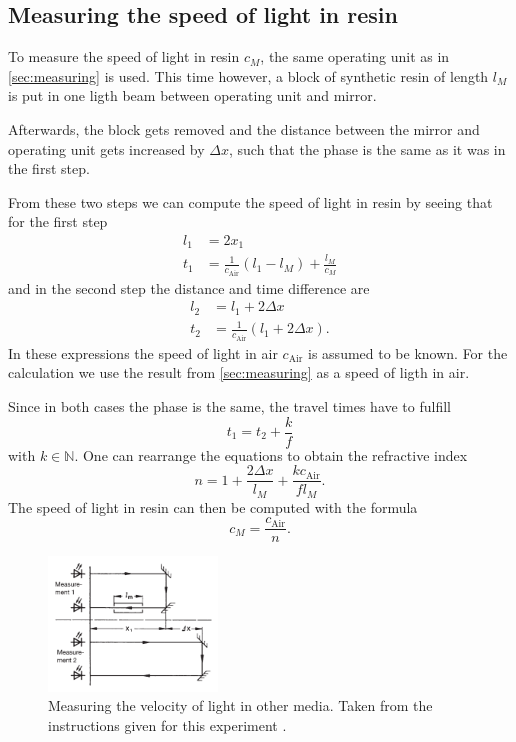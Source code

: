 \subsection{Measuring the speed of light in resin}
\label{sec:MeasuringResin}
To measure the speed of light in resin $c_M$, the same operating unit as in \autoref{sec:measuring} is
used. This time however, a block of synthetic resin of length $l_M$ is put in one ligth beam between
operating unit and mirror.

Afterwards, the block gets removed and the distance between the mirror and operating unit gets
increased by $\Delta x$, such that the phase is the same as it was in the first step.

From these two steps we can compute the speed of light in resin by seeing that for the first step
\begin{align}
  l_1 &= 2 x_1 \\
  t_1 &= \frac{1}{c_\text{Air}} (l_1 - l_M) + \frac{l_M}{c_M}
\end{align}
and in the second step the distance and time difference are
\begin{align}
  l_2 &= l_1 + 2\Delta x \\
  t_2 &= \frac{1}{c_\text{Air}} (l_1 + 2 \Delta x).
\end{align}
In these expressions the speed of light in air $c_\text{Air}$ is assumed to be known. For the calculation
we
use the result from \autoref{sec:measuring} as a speed of ligth in air.

Since in both cases the phase is the same, the travel times have to fulfill 
\[
  t_1 = t_2 + \frac{k}{f}
\]
with $k\in\mathbb{N}$. One can rearrange the equations to obtain the refractive index
\begin{equation}
  n = 1 + \frac{2 \Delta x}{l_M} + \frac{k c_\text{Air}}{f l_M}.
\end{equation}
The speed of light in resin can then be computed with the formula
\begin{equation}
  c_M = \frac{c_\text{Air}}{n}.
\end{equation}

\begin{figure}
    \centering
    \includegraphics[width=0.4\textwidth]{media/Setup Resin.png}
    \caption{Measuring the velocity of light in other media. Taken
      from the instructions given for this experiment \cite{LabInstructions}.}
    \label{fig:SetupResin}
\end{figure}

